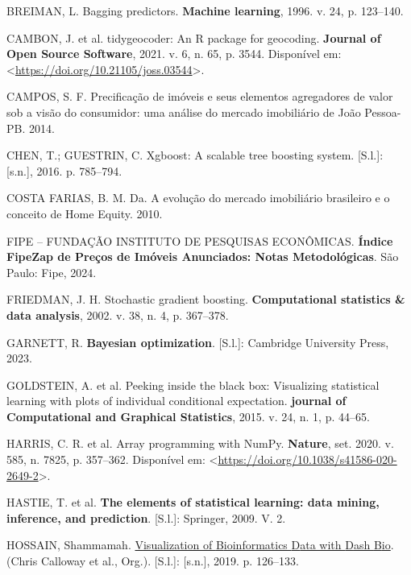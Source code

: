 \documentclass[
  12pt,
  a4paper,
]{scrreprt}
\newlength{\cslhangindent}
\newenvironment{CSLReferences}[2] %
 {\begin{list}{}{%
  \setlength{\itemindent}{0pt}
  \setlength{\leftmargin}{0pt}
  \setlength{\parsep}{0pt}
  \ifodd #1
   \setlength{\leftmargin}{\cslhangindent}
   \setlength{\itemindent}{-1\cslhangindent}
  \fi
  \setlength{\itemsep}{#2\baselineskip}}}
 {\end{list}}
\begin{document}
\begin{CSLReferences}{0}{1}
BREIMAN, L. Bagging predictors. \textbf{Machine learning}, 1996. v. 24,
p. 123--140.

CAMBON, J. et al. tidygeocoder: An R package for geocoding.
\textbf{Journal of Open Source Software}, 2021. v. 6, n. 65, p. 3544.
Disponível em:
\textless{}\url{https://doi.org/10.21105/joss.03544}\textgreater.

CAMPOS, S. F. Precifica{ç}{ã}o de im{ó}veis e seus elementos agregadores
de valor sob a vis{ã}o do consumidor: uma an{á}lise do mercado
imobili{á}rio de Jo{ã}o Pessoa-PB. 2014.

CHEN, T.; GUESTRIN, C. Xgboost: A scalable tree boosting system.
{[}S.l.{]}: {[}s.n.{]}, 2016. p. 785--794.

COSTA FARIAS, B. M. Da. A evolu{ç}{ã}o do mercado imobili{á}rio
brasileiro e o conceito de Home Equity. 2010.

FIPE -- FUNDAÇÃO INSTITUTO DE PESQUISAS ECONÔMICAS. \textbf{Índice
FipeZap de Preços de Imóveis Anunciados: Notas Metodológicas}. São
Paulo: Fipe, 2024.

FRIEDMAN, J. H. Stochastic gradient boosting. \textbf{Computational
statistics \& data analysis}, 2002. v. 38, n. 4, p. 367--378.

GARNETT, R. \textbf{Bayesian optimization}. {[}S.l.{]}: Cambridge
University Press, 2023.

GOLDSTEIN, A. et al. Peeking inside the black box: Visualizing
statistical learning with plots of individual conditional expectation.
\textbf{journal of Computational and Graphical Statistics}, 2015. v. 24,
n. 1, p. 44--65.

HARRIS, C. R. et al. Array programming with {NumPy}. \textbf{Nature},
set. 2020. v. 585, n. 7825, p. 357--362. Disponível em:
\textless{}\url{https://doi.org/10.1038/s41586-020-2649-2}\textgreater.

HASTIE, T. et al. \textbf{The elements of statistical learning: data
mining, inference, and prediction}. {[}S.l.{]}: Springer, 2009. V. 2.

HOSSAIN, Shammamah.
\href{https://doi.org/10.25080/Majora-7ddc1dd1-012}{{V}isualization of
{B}ioinformatics {D}ata with {D}ash {B}io}. (Chris Calloway et al.,
Org.). {[}S.l.{]}: {[}s.n.{]}, 2019. p. 126--133.


\end{CSLReferences}
\end{document}
